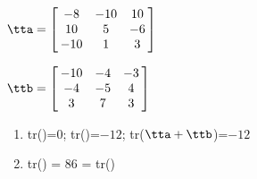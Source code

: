 {$\tta = \left[\hskip -3pt \begin{array}{ccc} -8&-10&10\\  10&5&-6
\\  -10&1&3\end{array}\hskip -3pt \right]$

$\ttb = \left[\hskip -3pt \begin{array}{ccc} -10&-4&-3\\  -4&-5&4
\\  3&7&3\end{array}\hskip -3pt \right]$
} 
{\begin{enumerate}
\item	tr(\tta)=0; tr(\ttb)=$-12$; tr($\tta+\ttb$)=$-12$
\item	tr(\tta\ttb) = 86 = tr(\ttb\tta)
\end{enumerate}
}



  

